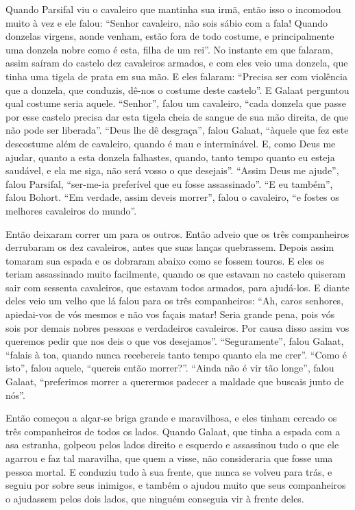 Quando Parsifal viu o cavaleiro que mantinha sua irmã, então isso o incomodou
muito à vez e ele falou: “Senhor cavaleiro, não sois sábio com a fala! Quando
donzelas virgens, aonde venham, estão fora de todo costume, e principalmente
uma donzela nobre como é esta, filha de um rei”. No instante em que falaram,
assim saíram do castelo dez cavaleiros armados, e com eles veio uma donzela,
que tinha uma tigela de prata em sua mão. E eles falaram: “Precisa ser com
violência que a donzela, que conduzis, dê-nos o costume deste castelo”. E
Galaat perguntou qual costume seria aquele. “Senhor”, falou um cavaleiro, “cada
donzela que passe por esse castelo precisa dar esta tigela cheia de sangue de
sua mão direita, de que não pode ser liberada”. “Deus lhe dê desgraça”, falou
Galaat, “àquele que fez este descostume além de cavaleiro, quando é mau e
interminável. E, como Deus me ajudar, quanto a esta donzela falhastes, quando,
tanto tempo quanto eu esteja saudável, e ela me siga, não será vosso o que
desejais”. “Assim Deus me ajude”, falou Parsifal, “ser-me-ia preferível que eu
fosse assassinado”. “E eu também”, falou Bohort. “Em verdade, assim deveis
morrer”, falou o cavaleiro, “e fostes os melhores cavaleiros do mundo”.

 Então deixaram correr um para os outros. Então adveio que os três companheiros
derrubaram os dez cavaleiros, antes que suas lanças quebrassem. Depois assim
tomaram sua espada e os dobraram abaixo como se fossem touros. E eles os teriam
assassinado muito facilmente, quando os que estavam no castelo quiseram sair
com sessenta cavaleiros, que estavam todos armados, para ajudá-los. E diante
deles veio um velho que lá falou para os três companheiros: “Ah, caros
senhores, apiedai-vos de vós mesmos e não vos façais matar! Seria grande pena,
pois vós sois por demais nobres pessoas e verdadeiros cavaleiros. Por causa
disso assim vos queremos pedir que nos deis o que vos desejamos”.
“Seguramente”, falou Galaat, “falais à toa, quando nunca recebereis tanto tempo
quanto ela me crer”. “Como é isto”, falou aquele, “quereis então morrer?”.
“Ainda não é vir tão longe”, falou Galaat, “preferimos morrer a querermos
padecer a maldade que buscais junto de nós”. 

Então começou a alçar-se briga grande e maravilhosa, e eles tinham cercado os
três companheiros de todos os lados. Quando Galaat, que tinha a espada com a
asa estranha, golpeou pelos lados direito e esquerdo e assassinou tudo o que
ele agarrou e faz tal maravilha, que quem a visse, não consideraria que fosse
uma pessoa mortal. E conduziu tudo à sua frente, que nunca se volveu para trás,
e seguiu por sobre seus inimigos, e também o ajudou muito que seus companheiros
o ajudassem pelos dois lados, que ninguém conseguia vir à frente deles. 

